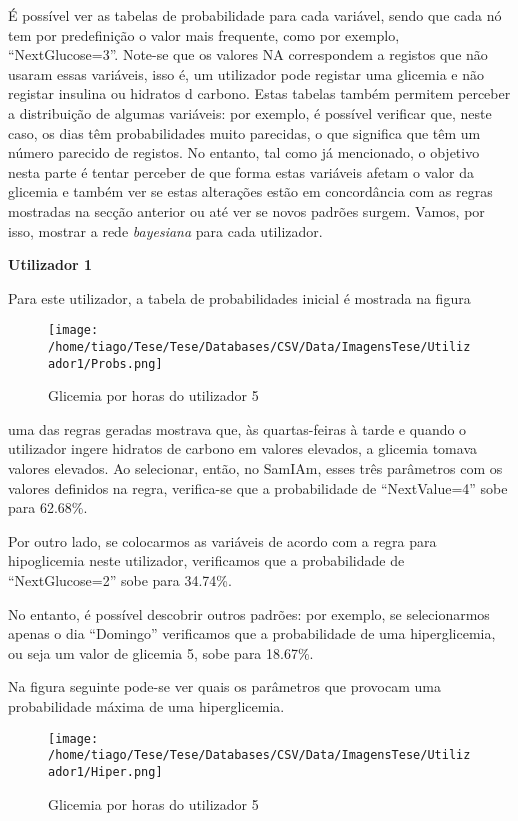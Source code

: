 É possível ver as tabelas de probabilidade para cada variável, sendo que cada nó tem por predefinição o valor mais frequente, como por exemplo, ``Next\textunderscore Glucose=3''. Note-se que os valores NA correspondem a registos que não usaram essas variáveis, isso é, um utilizador pode registar uma glicemia e não registar insulina ou hidratos d carbono. Estas tabelas também permitem perceber a distribuição de algumas variáveis: por exemplo, é possível verificar que, neste caso, os dias têm probabilidades muito parecidas, o que significa que têm um número parecido de registos. No entanto, tal como já mencionado, o objetivo nesta parte é tentar perceber de que forma estas variáveis afetam o valor da glicemia e também ver se estas alterações estão em concordância com as regras mostradas na secção anterior ou até ver se novos padrões surgem. Vamos, por isso, mostrar a rede \textit{bayesiana} para cada utilizador. 

\textbf{Utilizador 1}

Para este utilizador, a tabela de probabilidades inicial é mostrada na figura

\begin{figure}[H]
\centering
\texttt{[image: /home/tiago/Tese/Tese/Databases/CSV/Data/ImagensTese/Utilizador1/Probs.png]}
\caption{Glicemia por horas do utilizador 5}
\end{figure}

uma das regras geradas mostrava que, às quartas-feiras à tarde e quando o utilizador ingere hidratos de carbono em valores elevados, a glicemia tomava valores elevados. Ao selecionar, então, no SamIAm, esses três parâmetros com os valores definidos na regra, verifica-se que a probabilidade de ``Next\textunderscore Value=4'' sobe para 62.68\%.

Por outro lado, se colocarmos as variáveis de acordo com a regra para hipoglicemia neste utilizador, verificamos que a probabilidade de ``Next\textunderscore Glucose=2'' sobe para 34.74\%.

No entanto, é possível descobrir outros padrões: por exemplo, se selecionarmos apenas o dia ``Domingo'' verificamos que a probabilidade de uma hiperglicemia, ou seja um valor de glicemia 5, sobe para 18.67\%. 

Na figura seguinte pode-se ver quais os parâmetros que provocam uma probabilidade máxima de uma hiperglicemia.

\begin{figure}[H]
\centering
\texttt{[image: /home/tiago/Tese/Tese/Databases/CSV/Data/ImagensTese/Utilizador1/Hiper.png]}
\caption{Glicemia por horas do utilizador 5}
\end{figure}


